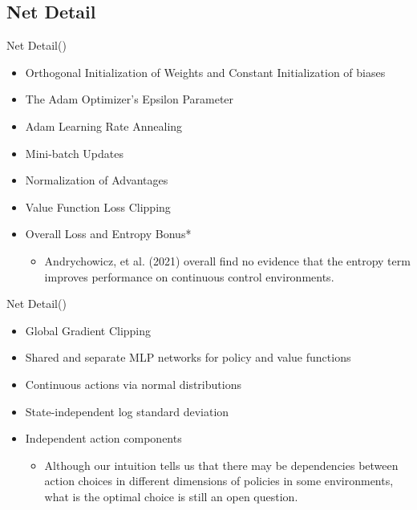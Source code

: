 \documentclass[english, xcolor=dvipsnames, aspectratio=169]{beamer}
\begin{document}
\subsection{Net Detail}
 \begin{frame}{Net Detail(\citet{blog})}
\begin{itemize}
    \item Orthogonal Initialization of Weights and Constant Initialization of biases
    \item The Adam Optimizer’s Epsilon Parameter 
    \item Adam Learning Rate Annealing
    \item Mini-batch Updates
    \item Normalization of Advantages
    \item Value Function Loss Clipping
    \item Overall Loss and Entropy Bonus*
    \begin{itemize}
        \item    Andrychowicz, et al. (2021) overall find no evidence that the entropy term improves performance on continuous control environments.
    \end{itemize}
    
 


\end{itemize}


 \end{frame}

 \begin{frame}{Net Detail(\citet{blog})}
\begin{itemize}

    \item Global Gradient Clipping
    \item Shared and separate MLP networks for policy and value functions
    \item Continuous actions via normal distributions
    \item State-independent log standard deviation 
    \item Independent action components 
    \begin{itemize}
        \item Although our intuition tells us that there may be dependencies between action choices in different dimensions of policies in some environments, what is the optimal choice is still an open question.
    \end{itemize}
 
\end{itemize}


 \end{frame}
\end{document}
